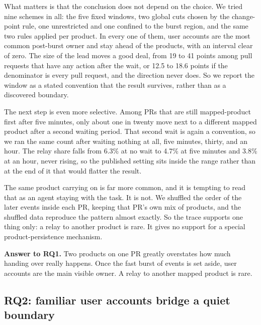 \documentclass[lineno,pdflatex,sn-basic]{sn-jnl}
\begin{document}
What matters is that the conclusion does not depend on the choice. We tried nine schemes in all: the five fixed windows, two global cuts chosen by
the change-point rule, one unrestricted and one confined to the burst region, and
the same two rules applied per product. In every one of them, user accounts are the most
common post-burst owner and stay ahead of the products, with an interval clear
of zero. The
size of the lead moves a good deal, from 19 to 41 points among pull requests that
have any action after the wait, or 12.5 to 18.6 points if the denominator is
every pull request, and the direction never does. So we report the window as a stated convention that the result survives,
rather than as a discovered boundary.

The next step is even more selective. Among PRs that are still mapped-product
first after five minutes, only about one in twenty move next to a different
mapped product after a second waiting period. That second wait is again a
convention, so we ran the same count after waiting nothing at all, five minutes,
thirty, and an hour. The relay share falls from 6.3\% at no wait to 4.7\% at five minutes and 3.8\%
at an hour, never rising, so the published setting sits inside the range rather
than at the end of it that would flatter the result.

The same product carrying on is far more common, and it is tempting to read
that as an agent staying with the task. It is not. We shuffled the order of
the later events inside each PR, keeping that PR's own mix of products, and
the shuffled data reproduce the pattern almost exactly. So the trace supports
one thing only: a relay to another product is rare. It gives no support for a
special product-persistence mechanism.

\noindent\textbf{Answer to RQ1.} Two products on one PR greatly overstates how much handing over really happens. Once the fast burst of events is set aside, user accounts are the main visible owner. A relay to another mapped product is rare.

\subsection{RQ2: familiar user accounts bridge a quiet boundary}
\end{document}
